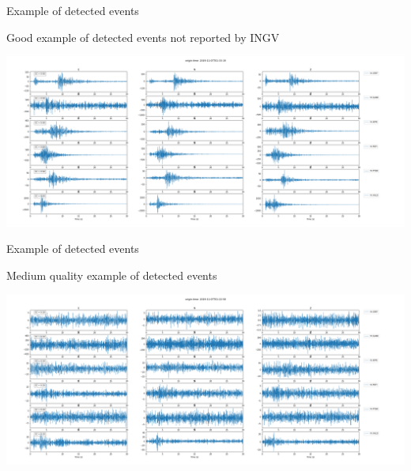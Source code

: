 \documentclass[aspectratio=43,9pt]{beamer}
\begin{document}
\begin{frame}{Example of detected events}
 
   \begin{minipage}{1\linewidth}
    \centering Good example of detected events not reported by INGV 
    \vskip 0.4cm 
    \begin{center}
     \includegraphics[width=1\linewidth]{figs/good2_2019-11-07T01-33-19-1p4.png}     
    \end{center}
  \end{minipage}
   
\end{frame}



\begin{frame}{Example of detected events}
 
   \begin{minipage}{1\linewidth}
    \centering Medium quality example of detected events 
    \vskip 0.4cm 
    \begin{center}
     \includegraphics[width=1\linewidth]{figs/medium_2019-11-07T01-22-58-1p2.png}     
    \end{center}
  \end{minipage}
   
\end{frame}
\end{document}
